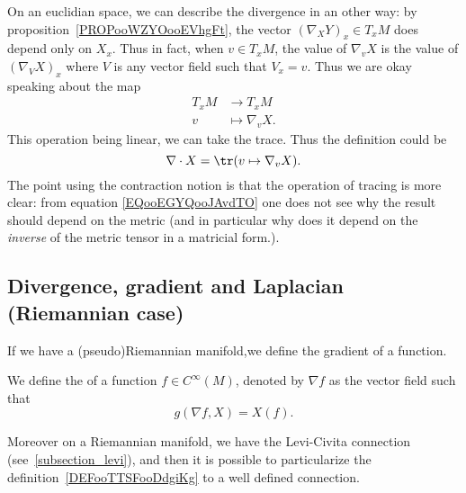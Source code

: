 On an euclidian space, we can describe the divergence in an other way: by proposition~\ref{PROPooWZYOooEVhgFt}, the vector \( (\nabla_XY)_x\in T_xM \) does depend only on \( X_x\). Thus in fact, when \( v\in T_xM\), the value of \( \nabla_vX\) is the value of \( (\nabla_VX)_{x}\) where \( V\) is any vector field such that \( V_x=v\). Thus we are okay speaking about the map
\begin{equation}
    \begin{aligned}
         T_xM&\to T_xM \\
        v&\mapsto \nabla_vX.
    \end{aligned}
\end{equation}
This operation being linear, we can take the trace. Thus the definition could be
\begin{equation}    \label{EQooEGYQooJAvdTO}
    \nabla\cdot X=\tr(v\mapsto \nabla_vX).
\end{equation}
The point using the contraction notion is that the operation of tracing is more clear: from equation \eqref{EQooEGYQooJAvdTO} one does not see why the result should depend on the metric (and in particular why does it depend on the \emph{inverse} of the metric tensor in a matricial form.).

\subsection{Divergence, gradient and Laplacian (Riemannian case)}

If we have a (pseudo)Riemannian manifold,we define the gradient of a function.
\begin{definition}
    We define the  of a function $f\in C^{\infty}(M)$, denoted by $\nabla f$ as the vector field such that
    \begin{equation}        \label{EQooECZSooYfQFYm}
        g(\nabla f,X)=X(f).
    \end{equation}
\end{definition}

Moreover on a Riemannian manifold, we have the Levi-Civita connection (see~\ref{subsection_levi}), and then it is possible to particularize the definition~\ref{DEFooTTSFooDdgiKg} to a well defined connection.


